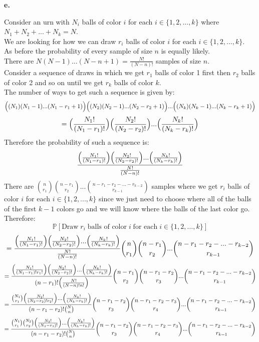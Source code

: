 \documentclass{article}
\begin{document}
\newpage
{\Large\textbf{e.}}
\begin{center}
\doublespacing
    Consider an urn with $N_i$ balls of color $i$ for each $i\in\{1, 2, ..., k\}$ where $N_1 + N_2 + ... + N_k = N$.
    \\We are looking for how we can draw $r_i$ balls of color $i$ for each $i\in\{1, 2, ..., k\}$.
    \\As before the probability of every sample of size $n$ is equally likely.
    \\There are $N(N-1)...(N-n+1) =\frac{N!}{(N-n)!}$ samples of size $n$.
    \\Consider a sequence of draws in which we get $r_1$ balls of color 1 first then $r_2$ balls of color 2 and so on until we get $r_k$ balls of color $k$.
    \\The number of ways to get such a sequence is given by:
    \[\Big{(}(N_1)(N_1 - 1)...(N_1 - r_1 + 1)\Big{)}\Big{(}(N_2)(N_2 - 1)...(N_2 - r_2 + 1)\Big{)}...\Big{(}(N_k)(N_k - 1)...(N_k - r_k + 1)\Big{)}\]
    \[=\Big{(}\frac{N_1!}{(N_1 - r_1)!}\Big{)}\Big{(}\frac{N_2!}{(N_2 - r_2)!}\Big{)}...\Big{(}\frac{N_k!}{(N_k - r_k)!}\Big{)}\]
    Therefore the probability of such a sequence is:
    \[\frac{\Big{(}\frac{N_1!}{(N_1 - r_1)!}\Big{)}\Big{(}\frac{N_2!}{(N_2 - r_2)!}\Big{)}...\Big{(}\frac{N_k!}{(N_k - r_k)!}\Big{)}}{\frac{N!}{(N-n)!}}\]
    There are $\binom{n}{r_1}\binom{n-r_1}{r_2}...\binom{n-r_1-r_2-...-r_{k-2}}{r_{k-1}}$ samples where we get $r_i$ balls of color $i$ for each $i\in\{1, 2, ..., k\}$ since we just need to choose where all of the balls of the first $k-1$ colors go and we will know where the balls of the last color go.
    \\Therefore:
    \[\mathbb{P}[\mbox{Draw}\;r_i\;\mbox{balls of color}\;i\;\mbox{for each}\;i\in\{1, 2, ..., k\}]\]
    \[=\frac{\Big{(}\frac{N_1!}{(N_1 - r_1)!}\Big{)}\Big{(}\frac{N_2!}{(N_2 - r_2)!}\Big{)}...\Big{(}\frac{N_k!}{(N_k - r_k)!}\Big{)}}{\frac{N!}{(N-n)!}}\binom{n}{r_1}\binom{n-r_1}{r_2}...\binom{n-r_1-r_2-...-r_{k-2}}{r_{k-1}}\]
    \[=\frac{\Big{(}\frac{N_1!}{(N_1 - r_1)!r_1!}\Big{)}\Big{(}\frac{N_2!}{(N_2 - r_2)!}\Big{)}...\Big{(}\frac{N_k!}{(N_k - r_k)!}\Big{)}}{(n-r_1)!\Big{(}\frac{N!}{(N-n)!n!}\Big{)}}\binom{n-r_1}{r_2}\binom{n-r_1-r_2}{r_3}...\binom{n-r_1-r_2-...-r_{k-2}}{r_{k-1}}\]
    \[=\frac{\binom{N_1}{r_1}\Big{(}\frac{N_2!}{(N_2 - r_2)!r_2!}\Big{)}...\Big{(}\frac{N_k!}{(N_k - r_k)!}\Big{)}}{(n-r_1-r_2)!\binom{N}{n}}\binom{n-r_1-r_2}{r_3}\binom{n-r_1-r_2-r_3}{r_4}...\binom{n-r_1-r_2-...-r_{k-2}}{r_{k-1}}\]
    \[=\frac{\binom{N_1}{r_1}\binom{N_2}{r_2}\Big{(}\frac{N_3!}{(N_3 - r_3)!}\Big{)}...\Big{(}\frac{N_k!}{(N_k - r_k)!}\Big{)}}{(n-r_1-r_2)!\binom{N}{n}}\binom{n-r_1-r_2}{r_3}\binom{n-r_1-r_2-r_3}{r_4}...\binom{n-r_1-r_2-...-r_{k-2}}{r_{k-1}}\]

\end{center}
\end{document}
